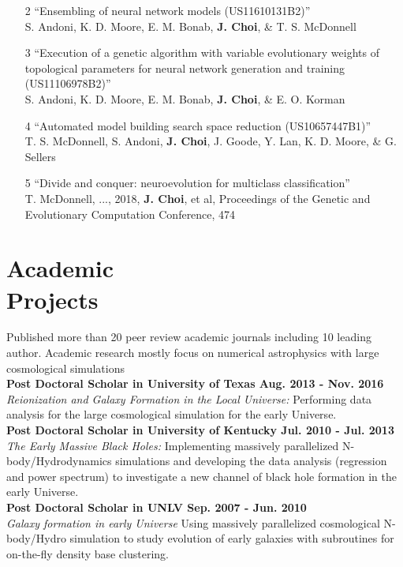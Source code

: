 \documentclass[margin,centered]{res}
\begin{document}
\begin{resume}
\begin{enumerate}

\item[2] ``Ensembling of neural network models (US11610131B2)'' \\ S. Andoni, K. D. Moore, E. M. Bonab, \textbf{J. Choi}, \& T. S. McDonnell 

\item[3] ``Execution of a genetic algorithm with variable evolutionary weights of topological parameters for neural network generation and training (US11106978B2)'' \\ S. Andoni, K. D. Moore, E. M. Bonab, \textbf{J. Choi}, \& E. O. Korman

\item[4] ``Automated model building search space reduction (US10657447B1)'' \\ T. S. McDonnell, S. Andoni, \textbf{J. Choi}, J. Goode, Y. Lan, K. D. Moore, \& G. Sellers

\item[5] ``Divide and conquer: neuroevolution for multiclass classification'' \\ T. McDonnell, ..., 2018, \textbf{J. Choi}, et al, Proceedings of the Genetic and Evolutionary Computation Conference, 474

\end{enumerate} 

\section{Academic \\ Projects} Published more than 20 peer review academic journals including 10 leading author. Academic research mostly focus on numerical astrophysics with large cosmological simulations\\
{\bf Post Doctoral Scholar in University of Texas Aug. 2013 - Nov. 2016} \\ 
{\it Reionization and Galaxy Formation in the Local Universe:} Performing data analysis for the large cosmological simulation for the early Universe.\\
{\bf Post Doctoral Scholar in University of Kentucky Jul. 2010 - Jul. 2013 } \\
{\it The Early Massive Black Holes:} Implementing massively parallelized N-body/Hydrodynamics simulations and developing the data analysis (regression and power spectrum) to investigate a new channel of black hole formation in the early Universe.\\
{\bf Post Doctoral Scholar in UNLV Sep. 2007 - Jun. 2010} \\
{\it Galaxy formation in early Universe}  Using massively parallelized cosmological N-body/Hydro simulation to study evolution of early galaxies with subroutines for on-the-fly density base clustering.


\end{resume}
\end{document}
